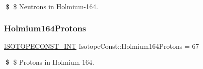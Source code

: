 \$ \$ Neutrons in Holmium-\/164. \mbox{\label{group___isotope_const-_holmium-_ho164_ga32bbb4453e5a299fa293bccb0de4928a}} 
\subsubsection{\texorpdfstring{Holmium164\+Protons}{Holmium164Protons}}
{\footnotesize\ttfamily \mbox{\hyperlink{group___isotope_const-_macros_ga5f18360b3e99483a35c32d789e62621c}{I\+S\+O\+T\+O\+P\+E\+C\+O\+N\+S\+T\+\_\+\+I\+NT}} Isotope\+Const\+::\+Holmium164\+Protons = 67}

\$ \$ Protons in Holmium-\/164. 